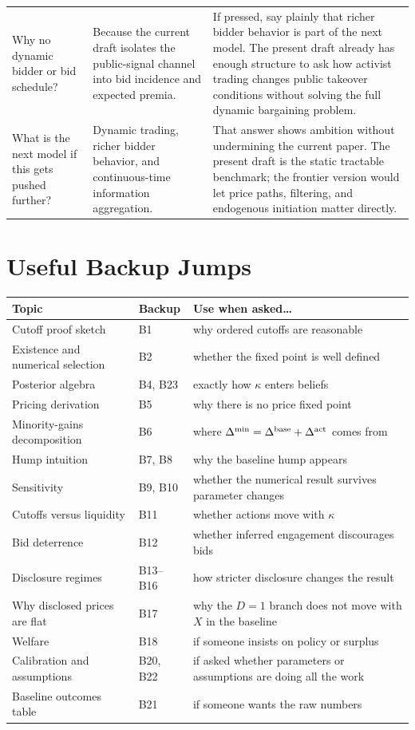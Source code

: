 \documentclass[9pt,a4paper]{extarticle}
\begin{document}
{\begin{longtable}{@{}P{0.24\textwidth}P{0.22\textwidth}P{0.48\textwidth}@{}}
Why no dynamic bidder or bid schedule? &
Because the current draft isolates the public-signal channel into bid incidence and expected premia. &
If pressed, say plainly that richer bidder behavior is part of the next model. The present draft already has enough structure to ask how activist trading changes public takeover conditions without solving the full dynamic bargaining problem. \\

What is the next model if this gets pushed further? &
Dynamic trading, richer bidder behavior, and continuous-time information aggregation. &
That answer shows ambition without undermining the current paper. The present draft is the static tractable benchmark; the frontier version would let price paths, filtering, and endogenous initiation matter directly. \\
\bottomrule
\end{longtable}
}

\section{Useful Backup Jumps}

{\footnotesize
\begin{tabularx}{\textwidth}{@{}P{0.31\textwidth}P{0.12\textwidth}Y@{}}
\toprule
\textbf{Topic} & \textbf{Backup} & \textbf{Use when asked\ldots} \\
\midrule
Cutoff proof sketch & B1 & why ordered cutoffs are reasonable \\
Existence and numerical selection & B2 & whether the fixed point is well defined \\
Posterior algebra & B4, B23 & exactly how $\kappa$ enters beliefs \\
Pricing derivation & B5 & why there is no price fixed point \\
Minority-gains decomposition & B6 & where $\Delta^{\min}=\Delta^{\textup{base}}+\Delta^{\textup{act}}$ comes from \\
Hump intuition & B7, B8 & why the baseline hump appears \\
Sensitivity & B9, B10 & whether the numerical result survives parameter changes \\
Cutoffs versus liquidity & B11 & whether actions move with $\kappa$ \\
Bid deterrence & B12 & whether inferred engagement discourages bids \\
Disclosure regimes & B13--B16 & how stricter disclosure changes the result \\
Why disclosed prices are flat & B17 & why the $D=1$ branch does not move with $X$ in the baseline \\
Welfare & B18 & if someone insists on policy or surplus \\
Calibration and assumptions & B20, B22 & if asked whether parameters or assumptions are doing all the work \\
Baseline outcomes table & B21 & if someone wants the raw numbers \\
\bottomrule
\end{tabularx}
}
\end{document}
